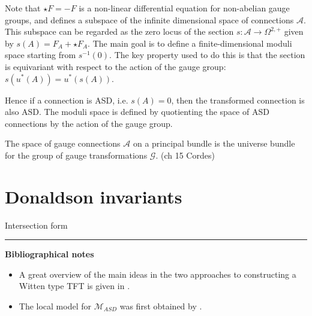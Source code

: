 Note that $\star F = - F$ is a non-linear differential equation for
non-abelian gauge groups, and defines a subspace of the infinite dimensional
space of connections $\mathcal{A}$. This subspace can be regarded as the zero
locus of the section $s : \mathcal{A} \to \Omega^{2,+}$ given by $s(A) =
F_A+\star F_A$. The main goal is to define a finite-dimensional moduli space
starting from  $s^{-1}(0)$. 
The key property used to do this is that the section is equivariant with respect
to the action of the gauge group: $s(u^*(A))=u^*(s(A))$.

Hence if a connection is ASD, i.e. $s(A)=0$, then the transformed connection is
also ASD. The moduli space is defined by quotienting the space of ASD
connections by the action of the gauge group. 



The space of gauge connections $\mathcal{A}$ on a principal bundle is the
universe bundle for the group of gauge transformations $\mathcal{G}$. (ch 15
Cordes)


\section{Donaldson invariants}
Intersection form

\vspace{5mm}
\hrule 
\vspace{5mm}



\textbf{Bibliographical notes}
{\small
\begin{itemize}
	\item A great overview of the main ideas in the two approaches to
		constructing a Witten type TFT is given in \citet{TQFTbook}.
	\item The local model for $\mathcal{M}_{ASD}$ was first obtained by 
		\citet{local_moduli}.
\end{itemize}
}

